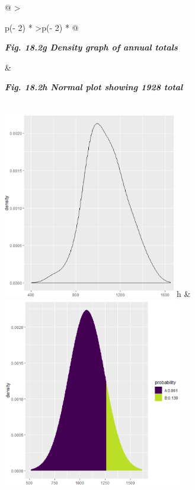 \documentclass[
  letterpaper,
  DIV=11,
  numbers=noendperiod]{scrreprt}
\begin{document}
\begin{longtable}[]{@{}
  >{\raggedright\arraybackslash}p{(\columnwidth - 2\tabcolsep) * }
  >{\raggedleft\arraybackslash}p{(\columnwidth - 2\tabcolsep) * }@{}}
\toprule\noalign{}
\begin{minipage}[b]{\linewidth}\raggedright
\textbf{\emph{Fig. 18.2g Density graph of annual totals}}
\end{minipage} & \begin{minipage}[b]{\linewidth}\raggedleft
\textbf{\emph{Fig. 18.2h Normal plot showing 1928 total}}
\end{minipage} \\
\midrule\noalign{}
\endhead
\bottomrule\noalign{}
\endlastfoot
\includegraphics[width=2.97312in,height=3.22243in]{figures/Fig18.2g.png}
h &
\includegraphics[width=3.07301in,height=\textheight]{figures/Fig18.2h.png} \\
\end{longtable}
\end{document}
